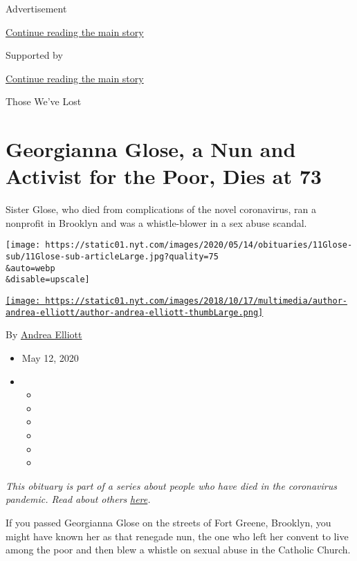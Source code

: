 Advertisement

\protect\hyperlink{after-top}{Continue reading the main story}

Supported by

\protect\hyperlink{after-sponsor}{Continue reading the main story}

Those We've Lost

\hypertarget{georgianna-glose-a-nun-and-activist-for-the-poor-dies-at-73}{%
\section{Georgianna Glose, a Nun and Activist for the Poor, Dies at
73}\label{georgianna-glose-a-nun-and-activist-for-the-poor-dies-at-73}}

Sister Glose, who died from complications of the novel coronavirus, ran
a nonprofit in Brooklyn and was a whistle-blower in a sex abuse scandal.

\texttt{[image: https://static01.nyt.com/images/2020/05/14/obituaries/11Glose-sub/11Glose-sub-articleLarge.jpg?quality=75\\\&auto=webp\\\&disable=upscale]}

\href{https://www.nytimes.com/by/andrea-elliott}{\texttt{[image: https://static01.nyt.com/images/2018/10/17/multimedia/author-andrea-elliott/author-andrea-elliott-thumbLarge.png]}}

By \href{https://www.nytimes.com/by/andrea-elliott}{Andrea Elliott}

\begin{itemize}
\item
  May 12, 2020
\item
  \begin{itemize}
  \item
  \item
  \item
  \item
  \item
  \item
  \end{itemize}
\end{itemize}

\emph{This obituary is part of a series about people who have died in
the coronavirus pandemic. Read about others}
\href{https://www.nytimes.com/series/people-who-have-died-of-the-coronavirus}{\emph{here}}\emph{.}

If you passed Georgianna Glose on the streets of Fort Greene, Brooklyn,
you might have known her as that renegade nun, the one who left her
convent to live among the poor and then blew a whistle on sexual abuse
in the Catholic Church.


